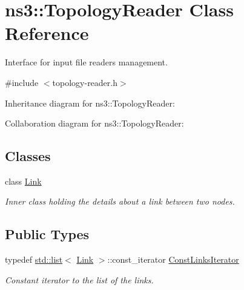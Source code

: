 \hypertarget{classns3_1_1TopologyReader}{}\section{ns3\+:\+:Topology\+Reader Class Reference}
\label{classns3_1_1TopologyReader}


Interface for input file readers management.  




{\ttfamily \#include $<$topology-\/reader.\+h$>$}



Inheritance diagram for ns3\+:\+:Topology\+Reader\+:


Collaboration diagram for ns3\+:\+:Topology\+Reader\+:
\subsection*{Classes}
\begin{DoxyCompactItemize}
\item 
class \hyperlink{classns3_1_1TopologyReader_1_1Link}{Link}
\begin{DoxyCompactList}\small\item\em Inner class holding the details about a link between two nodes. \end{DoxyCompactList}\end{DoxyCompactItemize}
\subsection*{Public Types}
\begin{DoxyCompactItemize}
\item 
typedef \hyperlink{openflow-interface_8h_afd9bcfa176617760671b67580f536fa7}{std\+::list}$<$ \hyperlink{classns3_1_1TopologyReader_1_1Link}{Link} $>$\+::const\+\_\+iterator \hyperlink{classns3_1_1TopologyReader_a13f936af0da10bb38b80bd23048bbe20}{Const\+Links\+Iterator}
\begin{DoxyCompactList}\small\item\em Constant iterator to the list of the links. \end{DoxyCompactList}\end{DoxyCompactItemize}
